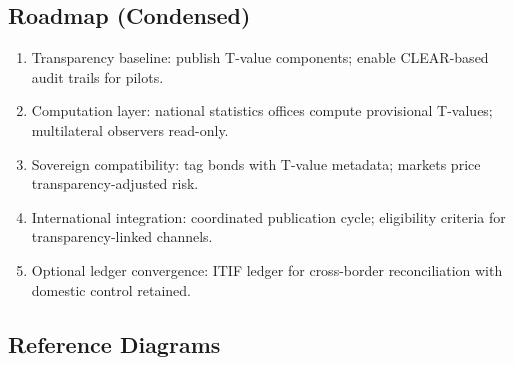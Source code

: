 \subsection{Roadmap (Condensed)}
\begin{enumerate}
  \item Transparency baseline: publish T-value components; enable CLEAR-based audit trails for pilots.
  \item Computation layer: national statistics offices compute provisional T-values; multilateral observers read-only.
  \item Sovereign compatibility: tag bonds with T-value metadata; markets price transparency-adjusted risk.
  \item International integration: coordinated publication cycle; eligibility criteria for transparency-linked channels.
  \item Optional ledger convergence: ITIF ledger for cross-border reconciliation with domestic control retained.
\end{enumerate}

\subsection{Reference Diagrams}
